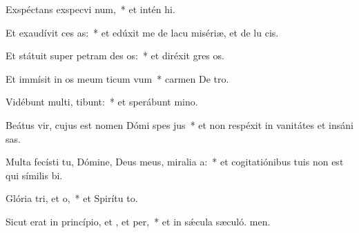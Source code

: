 \item Exspéctans exspecvi num,~* et intén hi.
\item Et exaudívit ces as:~* et edúxit me de lacu misériæ, et de lu cis.
\item Et státuit super petram des os:~* et diréxit gres os.
\item Et immísit in os meum ticum vum~* carmen De tro.
\item Vidébunt multi,  tibunt:~* et sperábunt  mino.
\item Beátus vir, cujus est nomen Dómi spes jus~* et non respéxit in vanitátes et insáni sas.
\item Multa fecísti tu, Dómine, Deus meus, miralia a:~* et cogitatiónibus tuis non est qui símilis  bi.
\item Glória tri, et o,~* et Spirítu to.
\item Sicut erat in princípio, et , et per,~* et in sǽcula sæculó. men.
